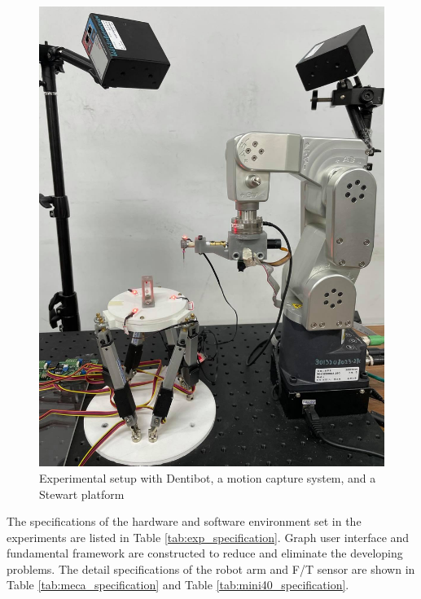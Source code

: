 \begin{figure}[htbp]
\begin{center}
\includegraphics[width=0.7\linewidth]{Images/System.jpg}
\caption{Experimental setup with Dentibot, a motion capture system, and a Stewart platform}
\label{fig:system}
\end{center}
\end{figure}
\par
The specifications of the hardware and software environment set in the experiments are listed in Table \ref{tab:exp_specification}. Graph user interface and fundamental framework are constructed to reduce and eliminate the developing problems.  The detail specifications of the robot arm and F/T sensor are shown in Table \ref{tab:meca_specification} and Table \ref{tab:mini40_specification}.

